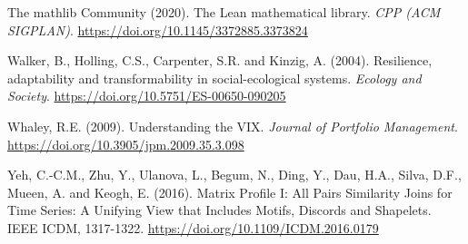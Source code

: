 \documentclass[
  11pt,
]{article}
\begin{document}
The mathlib Community (2020). The Lean mathematical library. \emph{CPP
(ACM SIGPLAN)}. \url{https://doi.org/10.1145/3372885.3373824}

Walker, B., Holling, C.S., Carpenter, S.R. and Kinzig, A. (2004).
Resilience, adaptability and transformability in social-ecological
systems. \emph{Ecology and Society}.
\url{https://doi.org/10.5751/ES-00650-090205}

Whaley, R.E. (2009). Understanding the VIX. \emph{Journal of Portfolio
Management}. \url{https://doi.org/10.3905/jpm.2009.35.3.098}

Yeh, C.-C.M., Zhu, Y., Ulanova, L., Begum, N., Ding, Y., Dau, H.A.,
Silva, D.F., Mueen, A. and Keogh, E. (2016). Matrix Profile I: All Pairs
Similarity Joins for Time Series: A Unifying View that Includes Motifs,
Discords and Shapelets. IEEE ICDM, 1317-1322.
\url{https://doi.org/10.1109/ICDM.2016.0179}
\end{document}
